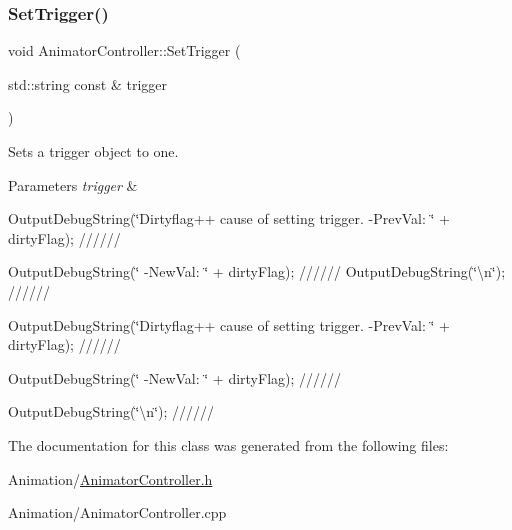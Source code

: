 \subsubsection{\texorpdfstring{Set\+Trigger()}{SetTrigger()}}
{\footnotesize\ttfamily void Animator\+Controller\+::\+Set\+Trigger (\begin{DoxyParamCaption}\item[{std\+::string const \&}]{trigger }\end{DoxyParamCaption})}



Sets a trigger object to one. 


\begin{DoxyParams}{Parameters}
{\em trigger} & \\
\hline
\end{DoxyParams}
Output\+Debug\+String(\char`\"{}\+Dirtyflag++ cause of setting trigger. -\/\+Prev\+Val\+: \char`\"{} + dirty\+Flag); //////

Output\+Debug\+String(\char`\"{} -\/\+New\+Val\+: \char`\"{} + dirty\+Flag); ////// Output\+Debug\+String(\char`\"{}\textbackslash{}n\char`\"{}); //////

Output\+Debug\+String(\char`\"{}\+Dirtyflag++ cause of setting trigger. -\/\+Prev\+Val\+: \char`\"{} + dirty\+Flag); //////

Output\+Debug\+String(\char`\"{} -\/\+New\+Val\+: \char`\"{} + dirty\+Flag); //////

Output\+Debug\+String(\char`\"{}\textbackslash{}n\char`\"{}); ////// 

The documentation for this class was generated from the following files\+:\begin{DoxyCompactItemize}
\item 
Animation/\hyperlink{AnimatorController_8h}{Animator\+Controller.\+h}\item 
Animation/Animator\+Controller.\+cpp\end{DoxyCompactItemize}
